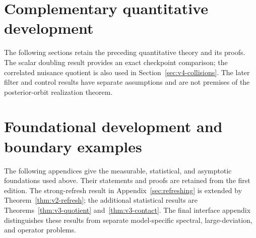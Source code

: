 
\section*{Complementary quantitative development}
The following sections retain the preceding quantitative theory and its
proofs. The scalar doubling result provides an exact checkpoint comparison;
the correlated nuisance quotient is also used in
Section~\ref{sec:v4-collisions}. The later filter and control results
have separate assumptions and are not premises of the posterior-orbit
realization theorem.



\appendix
\section*{Foundational development and boundary examples}
The following appendices give the measurable, statistical, and asymptotic
foundations used above. Their statements and proofs are retained from the
first edition. The strong-refresh result in Appendix~\ref{sec:refreshing}
is extended by Theorem~\ref{thm:v2-refresh}; the additional statistical
results are Theorems~\ref{thm:v3-quotient} and~\ref{thm:v3-contact}.
The final interface appendix distinguishes these results from separate
model-specific spectral, large-deviation, and operator problems.













